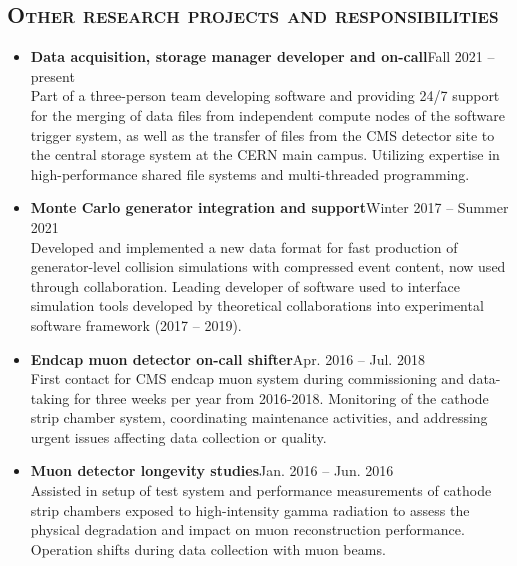 \documentclass[10pt]{res} %
\begin{document}
\begin{resume}
\section{\textsc{Other research projects and responsibilities}}
\begin{itemize}
  \item\textbf{Data acquisition, storage manager developer and on-call}\hfill{Fall 2021 -- present} \\
    Part of a three-person team developing software and providing 24/7 support for the merging
    of data files from independent compute nodes of the software trigger system,
    as well as the transfer of files from the CMS detector site to the central storage system
    at the CERN main campus. Utilizing expertise in high-performance shared file systems and multi-threaded
    programming.

  \item\textbf{Monte Carlo generator integration and support}\hfill{Winter 2017 -- Summer 2021} \\
    Developed and implemented a new data format for fast production
    of generator-level collision simulations with compressed event content, now used through collaboration. 
    Leading developer of software used to interface simulation tools
    developed by theoretical collaborations into experimental software framework (2017 -- 2019).

  \item\textbf{Endcap muon detector on-call shifter}\hfill{Apr. 2016 -- Jul. 2018} \\
    First contact for CMS endcap muon system during commissioning and data-taking for three weeks per year
    from 2016-2018. Monitoring of the cathode strip chamber system, coordinating maintenance activities,
    and addressing urgent issues affecting data collection or quality.

  \item\textbf{Muon detector longevity studies}\hfill{Jan. 2016 -- Jun. 2016} \\
    Assisted in setup of test system and performance measurements of cathode strip chambers
    exposed to high-intensity gamma radiation to assess the physical degradation and impact on muon
    reconstruction performance. Operation shifts during data collection with muon beams.
\end{itemize}

\vspace{-2mm}

\end{resume}
\end{document}

